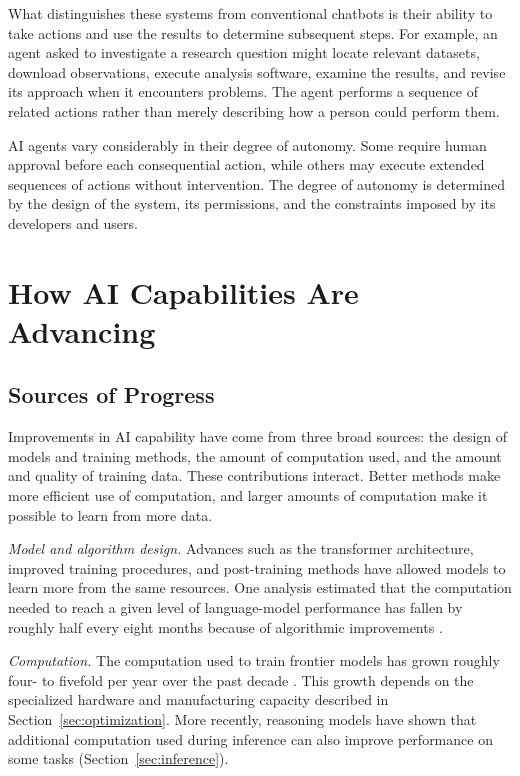 \documentclass[11pt]{article}
\begin{document}
What distinguishes these systems from conventional chatbots is their ability to take actions and use the results to determine subsequent steps. For example, an agent asked to investigate a research question might locate relevant datasets, download observations, execute analysis software, examine the results, and revise its approach when it encounters problems. The agent performs a sequence of related actions rather than merely describing how a person could perform them.

AI agents vary considerably in their degree of autonomy.
Some require human approval before each consequential action,
while others may execute extended sequences of actions
without intervention. The degree of autonomy is determined
by the design of the system, its permissions, and the
constraints imposed by its developers and users.

\FloatBarrier
\section{How AI Capabilities Are Advancing}\label{sec:progress}

\subsection{Sources of Progress}

Improvements in AI capability have come from three broad sources: the design of models and training methods, the amount of computation used, and the amount and quality of training data. These contributions interact. Better methods make more efficient use of computation, and larger amounts of computation make it possible to learn from more data.

\textit{Model and algorithm design.} Advances such as the transformer architecture, improved training procedures, and post-training methods have allowed models to learn more from the same resources. One analysis estimated that the computation needed to reach a given level of language-model performance has fallen by roughly half every eight months because of algorithmic improvements \citep{Ho2024AlgorithmicProgress}.

\textit{Computation.} The computation used to train frontier models has grown roughly four- to fivefold per year over the past decade \citep{Sevilla2024ComputeTrends}. This growth depends on the specialized hardware and manufacturing capacity described in Section~\ref{sec:optimization}. More recently, reasoning models have shown that additional computation used during inference can also improve performance on some tasks (Section~\ref{sec:inference}).
\end{document}
